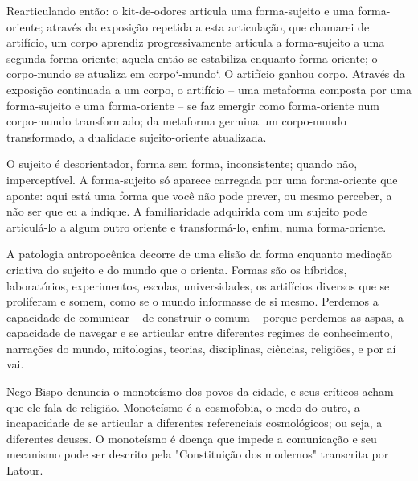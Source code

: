 Rearticulando então: o kit-de-odores articula uma forma-sujeito e uma forma-oriente; através da exposição repetida a esta articulação, que chamarei de artifício, um corpo aprendiz progressivamente articula a forma-sujeito a uma segunda forma-oriente; aquela então se estabiliza enquanto forma-oriente; o corpo-mundo se atualiza em corpo`-mundo`. O artifício \guillemetleft ganhou corpo\guillemetright. Através da exposição continuada a um corpo, o artifício -- uma metaforma composta por uma forma-sujeito e uma forma-oriente -- se faz emergir como forma-oriente num corpo-mundo transformado; da metaforma germina um corpo-mundo transformado, a dualidade sujeito-oriente atualizada.

O sujeito é desorientador, forma sem forma, inconsistente; quando não, imperceptível. A forma-sujeito só aparece carregada por uma forma-oriente que aponte: aqui está uma forma que você não pode prever, ou mesmo perceber, a não ser que eu a indique. A familiaridade adquirida com um sujeito pode articulá-lo a algum outro oriente e transformá-lo, enfim, numa forma-oriente.

A patologia antropocênica decorre de uma elisão da forma enquanto mediação criativa do sujeito e do mundo que o orienta. Formas são os híbridos, laboratórios, experimentos, escolas, universidades, os artifícios diversos que se proliferam e somem, como se o mundo informasse de si mesmo. Perdemos a capacidade de comunicar -- de construir o comum -- porque perdemos as aspas, a capacidade de navegar e se articular entre diferentes regimes de conhecimento, narrações do mundo, mitologias, teorias, disciplinas, ciências, religiões, e por aí vai.

Nego Bispo denuncia o monoteísmo dos povos da cidade, e seus críticos acham que ele fala de religião. Monoteísmo é a cosmofobia, o medo do outro, a incapacidade de se articular a diferentes referenciais cosmológicos; ou seja, a diferentes deuses. O monoteísmo é doença que impede a comunicação e seu mecanismo pode ser descrito pela "Constituição dos modernos" transcrita por Latour.


